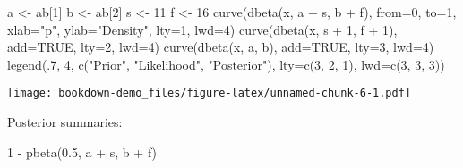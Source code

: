 \documentclass[
]{book}
\newenvironment{Shaded}{\begin{snugshade}}{\end{snugshade}}
\newcommand{\AttributeTok}[1]{\textcolor[rgb]{0.77,0.63,0.00}{#1}}
\newcommand{\ConstantTok}[1]{\textcolor[rgb]{0.00,0.00,0.00}{#1}}
\newcommand{\DecValTok}[1]{\textcolor[rgb]{0.00,0.00,0.81}{#1}}
\newcommand{\FloatTok}[1]{\textcolor[rgb]{0.00,0.00,0.81}{#1}}
\newcommand{\FunctionTok}[1]{\textcolor[rgb]{0.00,0.00,0.00}{#1}}
\newcommand{\NormalTok}[1]{#1}
\newcommand{\OtherTok}[1]{\textcolor[rgb]{0.56,0.35,0.01}{#1}}
\newcommand{\SpecialCharTok}[1]{\textcolor[rgb]{0.00,0.00,0.00}{#1}}
\newcommand{\StringTok}[1]{\textcolor[rgb]{0.31,0.60,0.02}{#1}}
\begin{document}
\begin{Shaded}
\begin{Highlighting}[]
\NormalTok{a }\OtherTok{\textless{}{-}}\NormalTok{ ab[}\DecValTok{1}\NormalTok{]}
\NormalTok{b }\OtherTok{\textless{}{-}}\NormalTok{ ab[}\DecValTok{2}\NormalTok{]}
\NormalTok{s }\OtherTok{\textless{}{-}} \DecValTok{11}
\NormalTok{f }\OtherTok{\textless{}{-}} \DecValTok{16}
\FunctionTok{curve}\NormalTok{(}\FunctionTok{dbeta}\NormalTok{(x, a }\SpecialCharTok{+}\NormalTok{ s, b }\SpecialCharTok{+}\NormalTok{ f), }\AttributeTok{from=}\DecValTok{0}\NormalTok{, }\AttributeTok{to=}\DecValTok{1}\NormalTok{, }
       \AttributeTok{xlab=}\StringTok{"p"}\NormalTok{, }\AttributeTok{ylab=}\StringTok{"Density"}\NormalTok{, }\AttributeTok{lty=}\DecValTok{1}\NormalTok{, }\AttributeTok{lwd=}\DecValTok{4}\NormalTok{)}
\FunctionTok{curve}\NormalTok{(}\FunctionTok{dbeta}\NormalTok{(x, s }\SpecialCharTok{+} \DecValTok{1}\NormalTok{, f }\SpecialCharTok{+} \DecValTok{1}\NormalTok{), }\AttributeTok{add=}\ConstantTok{TRUE}\NormalTok{, }
       \AttributeTok{lty=}\DecValTok{2}\NormalTok{, }\AttributeTok{lwd=}\DecValTok{4}\NormalTok{)}
\FunctionTok{curve}\NormalTok{(}\FunctionTok{dbeta}\NormalTok{(x, a, b), }\AttributeTok{add=}\ConstantTok{TRUE}\NormalTok{, }\AttributeTok{lty=}\DecValTok{3}\NormalTok{, }\AttributeTok{lwd=}\DecValTok{4}\NormalTok{)}
\FunctionTok{legend}\NormalTok{(.}\DecValTok{7}\NormalTok{, }\DecValTok{4}\NormalTok{, }\FunctionTok{c}\NormalTok{(}\StringTok{"Prior"}\NormalTok{, }\StringTok{"Likelihood"}\NormalTok{,}
                \StringTok{"Posterior"}\NormalTok{),}
       \AttributeTok{lty=}\FunctionTok{c}\NormalTok{(}\DecValTok{3}\NormalTok{, }\DecValTok{2}\NormalTok{, }\DecValTok{1}\NormalTok{), }\AttributeTok{lwd=}\FunctionTok{c}\NormalTok{(}\DecValTok{3}\NormalTok{, }\DecValTok{3}\NormalTok{, }\DecValTok{3}\NormalTok{))}
\end{Highlighting}
\end{Shaded}

\texttt{[image: bookdown-demo\_files/figure-latex/unnamed-chunk-6-1.pdf]}

Posterior summaries:

\begin{Shaded}
\begin{Highlighting}[]
\DecValTok{1} \SpecialCharTok{{-}} \FunctionTok{pbeta}\NormalTok{(}\FloatTok{0.5}\NormalTok{, a }\SpecialCharTok{+}\NormalTok{ s, b }\SpecialCharTok{+}\NormalTok{ f)}
\end{Highlighting}
\end{Shaded}
\end{document}
